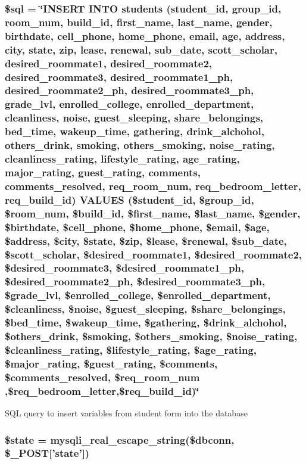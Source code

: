 {\subsubsection[{\$sql}]{\setlength{\rightskip}{0pt plus 5cm}\$sql = \char`\"{}\-I\-N\-S\-E\-R\-T \-I\-N\-T\-O students (student\-\_\-id, group\-\_\-id, room\-\_\-num, build\-\_\-id, first\-\_\-name, last\-\_\-name, gender, birthdate, cell\-\_\-phone, home\-\_\-phone, email, age, address, city, state, zip, lease, renewal, sub\-\_\-date, scott\-\_\-scholar, desired\-\_\-roommate1, desired\-\_\-roommate2, desired\-\_\-roommate3, desired\-\_\-roommate1\-\_\-ph, desired\-\_\-roommate2\-\_\-ph, desired\-\_\-roommate3\-\_\-ph, grade\-\_\-lvl, enrolled\-\_\-college, enrolled\-\_\-department, cleanliness, noise, guest\-\_\-sleeping, share\-\_\-belongings, bed\-\_\-time, wakeup\-\_\-time, gathering, drink\-\_\-alchohol, others\-\_\-drink, smoking, others\-\_\-smoking, noise\-\_\-rating, cleanliness\-\_\-rating, lifestyle\-\_\-rating, age\-\_\-rating, major\-\_\-rating, guest\-\_\-rating, comments, comments\-\_\-resolved, req\-\_\-room\-\_\-num, req\-\_\-bedroom\-\_\-letter, req\-\_\-build\-\_\-id) \-V\-A\-L\-U\-E\-S (\$student\-\_\-id, \$group\-\_\-id, \$room\-\_\-num, \$build\-\_\-id, \$first\-\_\-name, \$last\-\_\-name, \$gender, \$birthdate, \$cell\-\_\-phone, \$home\-\_\-phone, \$email, \$age, \$address, \$city, \$state, \$zip, \$lease, \$renewal, \$sub\-\_\-date, \$scott\-\_\-scholar, \$desired\-\_\-roommate1, \$desired\-\_\-roommate2, \$desired\-\_\-roommate3, \$desired\-\_\-roommate1\-\_\-ph, \$desired\-\_\-roommate2\-\_\-ph, \$desired\-\_\-roommate3\-\_\-ph, \$grade\-\_\-lvl, \$enrolled\-\_\-college, \$enrolled\-\_\-department, \$cleanliness, \$noise, \$guest\-\_\-sleeping, \$share\-\_\-belongings, \$bed\-\_\-time, \$wakeup\-\_\-time, \$gathering, \$drink\-\_\-alchohol, \$others\-\_\-drink, \$smoking, \$others\-\_\-smoking, \$noise\-\_\-rating, \$cleanliness\-\_\-rating, \$lifestyle\-\_\-rating, \$age\-\_\-rating, \$major\-\_\-rating, \$guest\-\_\-rating, \$comments, \$comments\-\_\-resolved, \$req\-\_\-room\-\_\-num ,\$req\-\_\-bedroom\-\_\-letter,\$req\-\_\-build\-\_\-id)\char`\"{}}}\label{admin__view_2validate_2studentVal_8php_a047170d6020a882807665812a27e2525}
\-S\-Q\-L query to insert variables from student form into the database \hypertarget{admin__view_2validate_2studentVal_8php_ae82306c4f2d17d8dd5c7d8d916b33bed}{
\subsubsection[{\$state}]{\setlength{\rightskip}{0pt plus 5cm}\$state = mysqli\-\_\-real\-\_\-escape\-\_\-string(\$dbconn, \$\-\_\-\-P\-O\-S\-T\mbox{[}'state'\mbox{]})}}\label{admin__view_2validate_2studentVal_8php_ae82306c4f2d17d8dd5c7d8d916b33bed}
